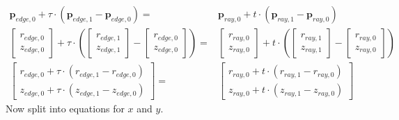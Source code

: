 \documentclass{article}
\begin{document}
\begin{align*}
	\bm{p}_{edge, 0} + \tau\cdot(\bm{p}_{edge, 1} - \bm{p}_{edge, 0}) =                                                                                                                                       & \bm{p}_{ray, 0} + t\cdot(\bm{p}_{ray, 1} - \bm{p}_{ray, 0})                                                                                                                                    \\
	\begin{bmatrix} r_{edge, 0} \\ z_{edge, 0} \end{bmatrix} + \tau\cdot\left(\begin{bmatrix} r_{edge, 1} \\ z_{edge, 1} \end{bmatrix}  -  \begin{bmatrix} r_{edge, 0} \\ z_{edge, 0} \end{bmatrix} \right) = & \begin{bmatrix} r_{ray, 0} \\ z_{ray, 0} \end{bmatrix} + t\cdot\left(\begin{bmatrix} r_{ray, 1} \\ z_{ray, 1} \end{bmatrix}  -  \begin{bmatrix} r_{ray, 0} \\ z_{ray, 0} \end{bmatrix} \right) \\
	\begin{bmatrix} r_{edge, 0} + \tau\cdot(r_{edge, 1} - r_{edge, 0}) \\ z_{edge, 0} + \tau\cdot(z_{edge, 1} - z_{edge, 0}) \end{bmatrix} =                                                                  & \begin{bmatrix} r_{ray, 0} + t\cdot(r_{ray, 1} - r_{ray, 0}) \\ z_{ray, 0} + t\cdot(z_{ray, 1} - z_{ray, 0}) \end{bmatrix}
\end{align*}
Now split into equations for $x$ and $y$.
\end{document}
